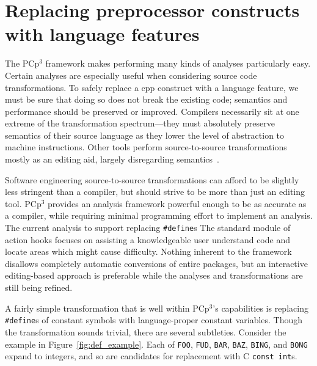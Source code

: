 \documentclass{article}
\newcommand{\pcp}{\mbox{\textsf{PCp}$^3$}}
\newcommand{\Cpp}{\mbox{\textsf{cpp}}}
\newcommand{\C}{\mbox{C}}
\newcommand{\ppd}[1]{\texttt{\##1}}
\newcommand{\figref}[1]{Figure~\ref{#1}}
\begin{document}




\section{Replacing preprocessor constructs with language features}
\label{sec:xform}

The \pcp{} framework makes performing many kinds of analyses
particularly easy.  Certain analyses are especially useful when
considering source code transformations.  To safely replace a \Cpp{}
construct with a language feature, we must be sure that doing so does
not break the existing code;  semantics and performance should be
preserved or improved.  Compilers necessarily sit at one extreme of the
transformation spectrum---they must absolutely preserve semantics of
their source language as they lower the level of abstraction to machine
instructions.  Other tools perform source-to-source transformations
mostly as an editing aid, largely disregarding semantics~\cite{C2J,C2JPP}.

Software engineering source-to-source transformations can afford to be
slightly less stringent than a compiler, but should strive to be more
than just an editing tool.  \pcp{} provides an analysis
framework powerful enough to be as accurate as a compiler, while
requiring minimal programming effort to implement an analysis.  The
current analysis to support replacing \ppd{define}s The
standard module of action hooks focuses on assisting a knowledgeable
user understand code and locate areas which might cause difficulty.
Nothing inherent to the framework disallows completely automatic
conversions of entire packages, but an interactive editing-based
approach is preferable while the analyses and
transformations are still being refined.

A fairly simple transformation that is well within \pcp{}'s capabilities
is replacing \ppd{define}s of constant symbols with language-proper
constant variables.  Though the transformation sounds trivial, there are
several subtleties.  Consider the example in
\figref{fig:def_example}.  Each of \texttt{FOO}, \texttt{FUD},
\texttt{BAR}, \texttt{BAZ}, \texttt{BING}, and \texttt{BONG} expand to
integers, and so are candidates for replacement with \C{} \texttt{const
  int}s.
\end{document}
